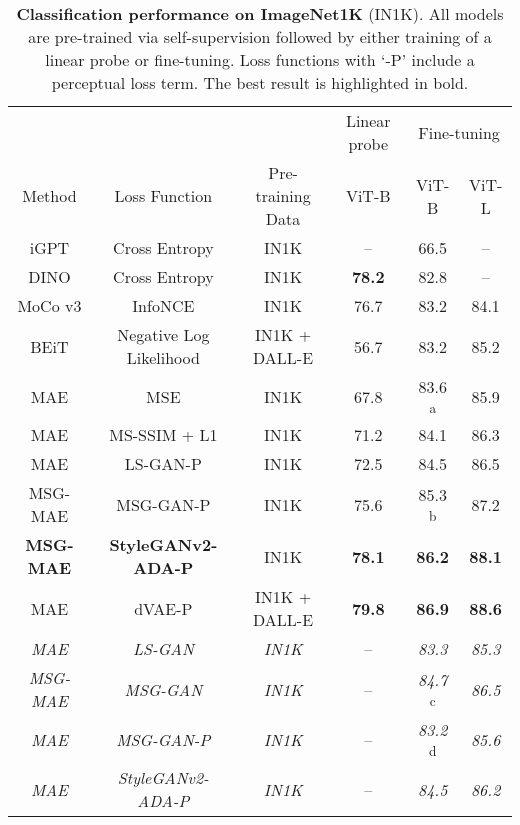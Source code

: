 \documentclass[10pt,twocolumn,letterpaper, cta-author]{article}
\begin{document}
\begin{table*}[t]
\caption{\textbf{Classification performance on ImageNet1K} (IN1K). All models are pre-trained via self-supervision followed by either training of a linear probe or fine-tuning. Loss functions with `-P' include a perceptual loss term. The best result is highlighted in bold.}
\begin{center}
 \begin{tabular}{c c c c c c} 
 \toprule
 \multicolumn{3}{c}{} & Linear probe & \multicolumn{2}{c}{Fine-tuning}\\
 Method & Loss Function & Pre-training Data & ViT-B & ViT-B & ViT-L \\ [0.5ex]
 \midrule
 iGPT \cite{pmlr-v119-chen20s} & Cross Entropy & IN1K & -- & 66.5 & -- \\
 DINO \cite{caron2021emerging} & Cross Entropy & IN1K & \textbf{78.2} & 82.8 & -- \\
 MoCo v3 \cite{chen2021mocov3} & InfoNCE \cite{Oord2018RepresentationLW} & IN1K & 76.7 & 83.2 & 84.1 \\
 \addlinespace
 BEiT \cite{bao2022beit}& Negative Log Likelihood & IN1K + DALL-E & 56.7 & 83.2 & 85.2 \\
 MAE \cite{MaskedAutoencoders2021} & MSE & IN1K & 67.8 & \hspace{0.5em}83.6\textsuperscript{ a} & 85.9 \\ 
 MAE & MS-SSIM + L1 & IN1K & 71.2 & 84.1 & 86.3 \\
 MAE & LS-GAN-P & IN1K & 72.5 & 84.5 & 86.5 \\
 \addlinespace
 MSG-MAE & MSG-GAN-P & IN1K & 75.6 & \hspace{0.5em}85.3\textsuperscript{ b} & 87.2 \\
 \textbf{MSG-MAE} & \textbf{StyleGANv2-ADA-P} & IN1K & \textbf{78.1} & \textbf{86.2} & \textbf{88.1}\\
 \midrule
 {MAE} & {dVAE-P} & {IN1K + DALL-E} & {\textbf{79.8}} & {\textbf{86.9}} & {\textbf{88.6}} \\
 \midrule
 \textit{MAE} & \textit{LS-GAN} & \textit{IN1K} & -- & \textit{83.3} & \textit{85.3} \\
 \textit{MSG-MAE} & \textit{MSG-GAN} & \textit{IN1K} & -- & \hspace{0.5em}\textit{84.7}\textsuperscript{ c} & \textit{86.5} \\
 \addlinespace
 \textit{MAE} & \textit{MSG-GAN-P} & \textit{IN1K} & -- & \hspace{0.5em}\textit{83.2}\textsuperscript{ d} & \textit{85.6} \\
 \textit{MAE} & \textit{StyleGANv2-ADA-P} & \textit{IN1K} & -- & \textit{84.5} & \textit{86.2} \\
\bottomrule
 
\end{tabular}
\end{center}
\label{tab:imagenet1k}
\end{table*}
\end{document}
